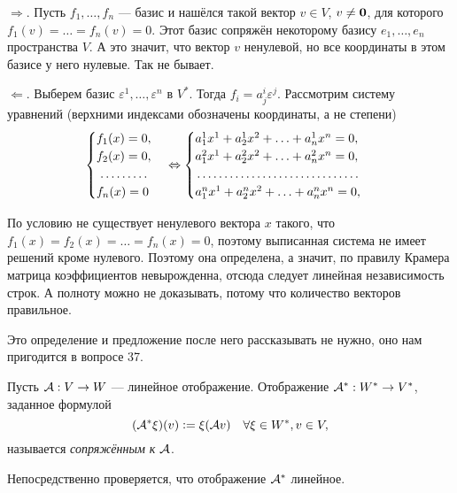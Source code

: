 \begin{solution}
    $\Rightarrow$. Пусть $f_1, \ldots, f_n$ --- базис и нашёлся такой вектор $v \in V$, $v \ne \boldsymbol{0}$, для которого $f_1(v) = \ldots = f_n(v) = 0$. Этот базис сопряжён некоторому базису $e_1, \ldots, e_n$ пространства $V$. А это значит, что вектор $v$ ненулевой, но все координаты в этом базисе у него нулевые. Так не бывает.

    $\Leftarrow$. Выберем базис $\varepsilon^1, \ldots, \varepsilon^n$ в $V^\ast$. Тогда $f_i = a^i_j\varepsilon^j$. Рассмотрим систему уравнений (верхними индексами обозначены координаты, а не степени)
    \[
        \begin{cases}
            f_1(x) = 0,\\
            f_2(x) = 0,\\
            \dotfill\\
            f_n(x) = 0\\
        \end{cases} \Leftrightarrow
        \begin{cases}
            a^1_1x^1 + a^1_2x^2 + \ldots + a^1_nx^n = 0,\\
            a^2_1x^1 + a^2_2x^2 + \ldots + a^2_nx^n = 0,\\
            \dotfill\\
            a^n_1x^1 + a^n_2x^2 + \ldots + a^n_nx^n = 0,\\
        \end{cases}
    \]

    По условию не существует ненулевого вектора $x$ такого, что $f_1(x) = f_2(x) = \ldots = f_n(x) = 0$, поэтому выписанная система не имеет решений кроме нулевого. Поэтому она определена, а значит, по правилу Крамера матрица коэффициентов невырожденна, отсюда следует линейная независимость строк. А полноту можно не доказывать, потому что количество векторов правильное.
\end{solution}

Это определение и предложение после него рассказывать не нужно, оно нам пригодится в вопросе 37.

\begin{definition}
    Пусть $\mathcal{A}: V \to W$ --- линейное отображение. Отображение $\mathcal{A}^\ast: W^\ast \to V^\ast$, заданное формулой
    \[
        (\mathcal{A}^\ast\xi)(v) \vcentcolon = \xi(\mathcal{A} v)\quad \forall \xi \in W^\ast, v \in V,
    \]
    называется \textit{сопряжённым к $\mathcal{A}$}.
\end{definition}

Непосредственно проверяется, что отображение $\mathcal{A}^\ast$ линейное.

